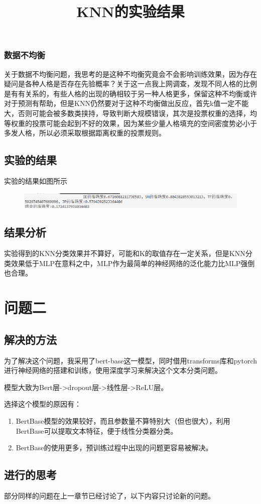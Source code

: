 \documentclass{article}
\begin{document}
	\subsubsection{数据不均衡}
	关于数据不均衡问题，我思考的是这种不均衡究竟会不会影响训练效果，因为存在疑问是各种人格是否存在先验概率？关于这一点我上网调查，发现不同人格的比例是有有关系的，有些人格的出现的确相较于另一种人格更多，保留这种不均衡或许对于预测有帮助，但是KNN仍然要对于这种不均衡做出反应，首先k值一定不能大，否则可能会被多数类挟持，导致判断大规模错误，其次是投票权重的选择，均等权重的投票可能会起到不好的效果，因为某些少量人格填充的空间密度势必小于多发人格，所以必须采取根据距离权重的投票规则。
	\subsection{实验的结果}
	实验的结果如图所示
	\begin{figure}[H]
		\centering
		\includegraphics[width=0.618\textheight]{1}
		\title{KNN的实验结果}
	\end{figure}
	\subsection{结果分析}
	实验得到的KNN分类效果并不算好，可能和K的取值存在一定关系，但是KNN分类效果低于MLP在意料之中，MLP作为最简单的神经网络的泛化能力比MLP强倒也合理。
	\section{问题二}
	\subsection{解决的方法}
	为了解决这个问题，我采用了bert-base这一模型，同时借用transforms库和pytorch进行神经网络的搭建和训练，使用深度学习来解决这个文本分类问题。
	
	模型大致为Bert层->dropout层->线性层->ReLU层。
	
	选择这个模型的原因有：
	\begin{enumerate}
		\item BertBase模型的效果较好，而且参数量不算特别大（但也很大），利用BertBase可以提取文本特征，便于线性分类器分类。
		\item BertBase的使用更多，预训练过程中出现的问题更容易被解决。
	\end{enumerate}
	\subsection{进行的思考}
	部分同样的问题在上一章节已经讨论了，以下内容只讨论新的问题。
\end{document}
